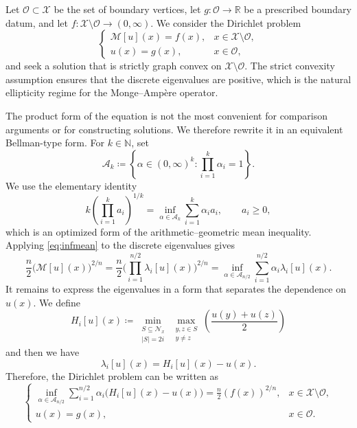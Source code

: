 \documentclass[reqno,11pt]{amsart}
\numberwithin{equation}{section}
\theoremstyle{definition}
\theoremstyle{remark}
\begin{document}
Let $\mathcal O\subset \mathcal X$ be the set of boundary vertices, let $g\colon \mathcal O\to \mathbb R$ be a prescribed boundary datum, and let $f\colon \mathcal X\setminus \mathcal O\to (0,\infty)$.  We consider the Dirichlet problem
\[
\begin{cases}
    \mathcal M [u](x)=f(x), & x\in\mathcal X\setminus\mathcal O,\\
    u(x)=g(x), & x\in\mathcal O,
\end{cases}
\]
and seek a solution that is strictly graph convex on $\mathcal X\setminus\mathcal O$. The strict convexity assumption ensures that the discrete eigenvalues are positive, which is the natural ellipticity regime for the Monge--Amp\`ere operator.

The product form of the equation is not the most convenient for comparison arguments or for constructing solutions.  We therefore rewrite it in an equivalent Bellman-type form.  For $k\in\mathbb N$, set
\[
    \mathcal A_k
    \coloneqq
    \left\{
        \alpha\in(0,\infty)^k:
        \prod_{i=1}^k \alpha_i=1
    \right\}.
\]
We use the elementary identity
\begin{equation}\label{eq:infmean}
    k\left(\prod_{i=1}^k a_i\right)^{1/k}
    =
    \inf_{\alpha\in\mathcal A_k}
    \sum_{i=1}^k \alpha_i a_i,
    \qquad a_i\geq 0,
\end{equation}
which is an optimized form of the arithmetic--geometric mean inequality. Applying \eqref{eq:infmean} to the discrete eigenvalues gives
\[
    \frac{n}{2}\bigl(\mathcal M [u](x)\bigr)^{2/n}
    = \frac{n}{2}\Big(
\prod_{i=1}^{n/2}\lambda_i[u](x) \Big)^{2/n}
=    \inf_{\alpha\in\mathcal A_{n/2}}
    \sum_{i=1}^{n/2}\alpha_i \lambda_i[u](x).
\]
It remains to express the eigenvalues in a form that separates the dependence on $u(x)$.  We define
\[
    H_i[u](x)
    \coloneqq
    \min_{\substack{S\subseteq \mathcal N_x\\ |S|=2i}}
    \max_{\substack{y,z\in S\\ y\neq z}}
    \left(
        \frac{u(y)+u(z)}{2}
    \right)
\]
and then we have
\[
    \lambda_i[u](x) = H_i[u](x) - u(x).
\]
Therefore, the Dirichlet problem can be written as
\begin{equation}\label{eq:M-A}
    \begin{cases}
        \displaystyle
        \inf_{\alpha\in\mathcal A_{n/2}}
        \sum_{i=1}^{n/2}
        \alpha_i\bigl(H_i[u](x)-u(x)\bigr)
        =
        \frac{n}{2} (f(x))^{2/n},
        & x\in\mathcal X\setminus\mathcal O,\\[2ex]
        u(x)=g(x),
        & x\in\mathcal O.
    \end{cases}
\end{equation}
\end{document}
